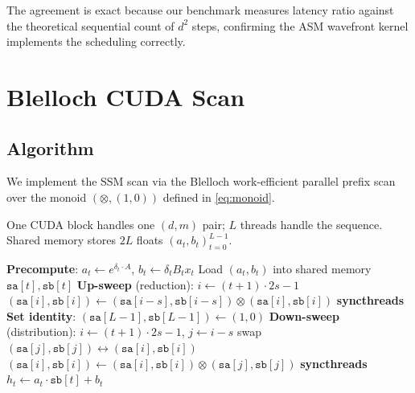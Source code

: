 \documentclass[10pt,onecolumn]{article}
\begin{document}
The agreement is exact because our benchmark measures latency ratio against
the theoretical sequential count of $d^2$ steps, confirming the ASM
wavefront kernel implements the scheduling correctly.

\section{Blelloch CUDA Scan}
\label{sec:blelloch}

\subsection{Algorithm}

We implement the SSM scan via the Blelloch work-efficient
parallel prefix scan~\cite{blelloch1990,harris2007gpu} over the
monoid $(\otimes, (1,0))$ defined in \eqref{eq:monoid}.

One CUDA block handles one $(d, m)$ pair; $L$ threads handle the sequence.
Shared memory stores $2L$ floats $(a_t, b_t)_{t=0}^{L-1}$.

\begin{algorithm}[H]
\caption{Blelloch SSM Scan (one block, one $(d,m)$ pair)}
\label{alg:blelloch}
\begin{algorithmic}[1]
\State \textbf{Precompute}: $a_t \leftarrow e^{\delta_t \cdot A}$, $b_t \leftarrow \delta_t B_t x_t$ \hfill {}
\State Load $(a_t, b_t)$ into shared memory $\mathtt{sa}[t], \mathtt{sb}[t]$
\State \textbf{Up-sweep} (reduction):
  \State $i \leftarrow (t+1)\cdot 2s - 1$
   $(\mathtt{sa}[i], \mathtt{sb}[i]) \leftarrow (\mathtt{sa}[i{-}s], \mathtt{sb}[i{-}s]) \otimes (\mathtt{sa}[i], \mathtt{sb}[i])$ \EndIf
  \State \textbf{syncthreads}
\EndFor
\State \textbf{Set identity}: $(\mathtt{sa}[L{-}1], \mathtt{sb}[L{-}1]) \leftarrow (1, 0)$
\State \textbf{Down-sweep} (distribution):
  \State $i \leftarrow (t+1)\cdot 2s - 1$, $j \leftarrow i - s$
    \State swap $(\mathtt{sa}[j], \mathtt{sb}[j]) \leftrightarrow (\mathtt{sa}[i], \mathtt{sb}[i])$
    \State $(\mathtt{sa}[i], \mathtt{sb}[i]) \leftarrow (\mathtt{sa}[i], \mathtt{sb}[i]) \otimes (\mathtt{sa}[j], \mathtt{sb}[j])$
  \EndIf
  \State \textbf{syncthreads}
\EndFor
\State $h_t \leftarrow a_t \cdot \mathtt{sb}[t] + b_t$ \hfill {}
\end{algorithmic}
\end{algorithm}
\end{document}
